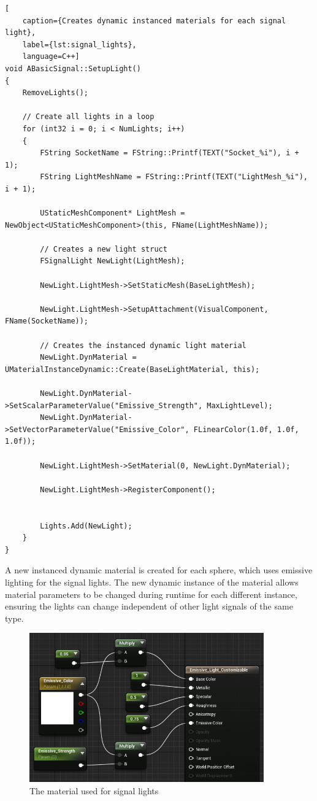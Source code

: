 \begin{lstlisting}[
    caption={Creates dynamic instanced materials for each signal light},
    label={lst:signal_lights},
    language=C++]
void ABasicSignal::SetupLight()
{
	RemoveLights();

	// Create all lights in a loop
	for (int32 i = 0; i < NumLights; i++)
	{
		FString SocketName = FString::Printf(TEXT("Socket_%i"), i + 1);
		FString LightMeshName = FString::Printf(TEXT("LightMesh_%i"), i + 1);

		UStaticMeshComponent* LightMesh = NewObject<UStaticMeshComponent>(this, FName(LightMeshName));

		// Creates a new light struct
		FSignalLight NewLight(LightMesh);

		NewLight.LightMesh->SetStaticMesh(BaseLightMesh);

		NewLight.LightMesh->SetupAttachment(VisualComponent, FName(SocketName));

		// Creates the instanced dynamic light material
		NewLight.DynMaterial = UMaterialInstanceDynamic::Create(BaseLightMaterial, this);

		NewLight.DynMaterial->SetScalarParameterValue("Emissive_Strength", MaxLightLevel);
		NewLight.DynMaterial->SetVectorParameterValue("Emissive_Color", FLinearColor(1.0f, 1.0f, 1.0f));

		NewLight.LightMesh->SetMaterial(0, NewLight.DynMaterial);

		NewLight.LightMesh->RegisterComponent();


		Lights.Add(NewLight);
	}
}
\end{lstlisting}

A new \Gls{instanced dynamic material} is created for each sphere, which uses emissive lighting for the signal lights. The new dynamic instance of the material allows material parameters to be changed during runtime for each different instance, ensuring the lights can change independent of other light signals of the same type. 

\begin{figure}[h]
    \centerline{\includegraphics[width=0.9\textwidth]{figures/Emissive_Light_Material.png}}
    \caption{The material used for signal lights}
\end{figure}

